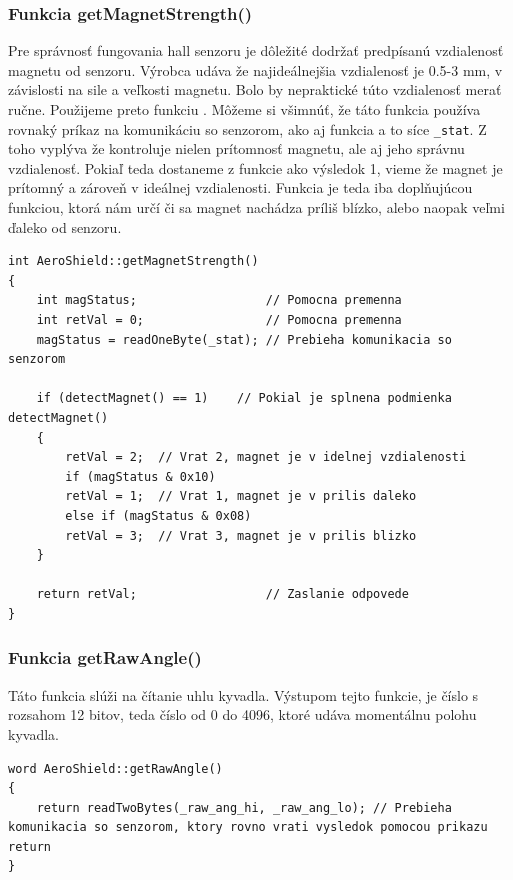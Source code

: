 \subsubsection{Funkcia getMagnetStrength()}

Pre správnosť fungovania hall senzoru je dôležité dodržať predpísanú vzdialenosť magnetu od senzoru. Výrobca udáva že najideálnejšia vzdialenosť je 0.5-3 mm, v závislosti na sile a veľkosti magnetu. Bolo by nepraktické túto vzdialenosť merať ručne. Použijeme preto funkciu . Môžeme si všimnúť, že táto funkcia používa rovnaký príkaz na komunikáciu so senzorom, ako aj funkcia  a to síce \verb|_stat|. Z toho vyplýva že  kontroluje nielen prítomnosť magnetu, ale aj jeho správnu vzdialenosť. Pokiaľ teda dostaneme z funkcie  ako výsledok 1, vieme že magnet je prítomný a zároveň v ideálnej vzdialenosti. Funkcia  je teda iba doplňujúcou funkciou, ktorá nám určí či sa magnet nachádza príliš blízko, alebo naopak veľmi ďaleko od senzoru. 

\begin{lstlisting}[caption={Zdrojový kód funkcie getMagnetStrength.},captionpos=b]
int AeroShield::getMagnetStrength()   
{
	int magStatus;                  // Pomocna premenna 
	int retVal = 0;                 // Pomocna premenna
	magStatus = readOneByte(_stat);	// Prebieha komunikacia so senzorom       
	
	if (detectMagnet() == 1)	// Pokial je splnena podmienka detectMagnet()
	{
		retVal = 2;  // Vrat 2, magnet je v idelnej vzdialenosti
		if (magStatus & 0x10)
		retVal = 1;  // Vrat 1, magnet je v prilis daleko
		else if (magStatus & 0x08)
		retVal = 3;  // Vrat 3, magnet je v prilis blizko
	}
	
	return retVal;                  // Zaslanie odpovede  
}
\end{lstlisting}

\subsubsection{Funkcia getRawAngle()}

Táto funkcia slúži na čítanie uhlu kyvadla. Výstupom tejto funkcie, je číslo s rozsahom 12 bitov, teda číslo od 0 do 4096, ktoré udáva momentálnu polohu kyvadla. 

\begin{lstlisting}[caption={Zdrojový kód funkcie getRawAngle.},captionpos=b]
word AeroShield::getRawAngle() 
{
	return readTwoBytes(_raw_ang_hi, _raw_ang_lo); // Prebieha komunikacia so senzorom, ktory rovno vrati vysledok pomocou prikazu return 
}
\end{lstlisting}

